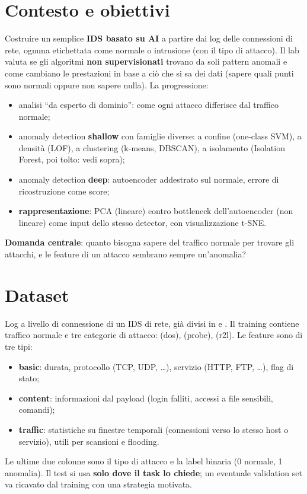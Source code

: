 \section{Contesto e obiettivi}
Costruire un semplice \textbf{IDS basato su AI} a partire dai log delle connessioni di rete, ognuna
etichettata come normale o intrusione (con il tipo di attacco). Il lab valuta se gli algoritmi
\textbf{non supervisionati} trovano da soli pattern anomali e come cambiano le prestazioni in base a
ciò che si sa dei dati (sapere quali punti sono normali oppure non sapere nulla). La progressione:
\begin{itemize}
  \item analisi ``da esperto di dominio'': come ogni attacco differisce dal traffico normale;
  \item anomaly detection \textbf{shallow} con famiglie diverse: a confine (one-class SVM), a densità
        (LOF), a clustering (k-means, DBSCAN), a isolamento (Isolation Forest, poi tolto: vedi sopra);
  \item anomaly detection \textbf{deep}: autoencoder addestrato sul normale, errore di ricostruzione
        come score;
  \item \textbf{rappresentazione}: PCA (lineare) contro bottleneck dell'autoencoder (non lineare) come
        input dello stesso detector, con visualizzazione t-SNE.
\end{itemize}
\textbf{Domanda centrale}: quanto bisogna sapere del traffico normale per trovare gli attacchi, e le
feature di un attacco sembrano sempre un'anomalia?

\section{Dataset}
Log a livello di connessione di un IDS di rete, già divisi in  e .
Il training contiene traffico normale e tre categorie di attacco:  (dos),
 (probe),  (r2l). Le feature sono di tre tipi:
\begin{itemize}
  \item \textbf{basic}: durata, protocollo (TCP, UDP, \ldots), servizio (HTTP, FTP, \ldots), flag di stato;
  \item \textbf{content}: informazioni dal payload (login falliti, accessi a file sensibili, comandi);
  \item \textbf{traffic}: statistiche su finestre temporali (connessioni verso lo stesso host o servizio),
        utili per scansioni e flooding.
\end{itemize}
Le ultime due colonne sono il tipo di attacco e la label binaria (0 normale, 1 anomalia). Il test si
usa \textbf{solo dove il task lo chiede}; un eventuale validation set va ricavato dal training con una
strategia motivata.

